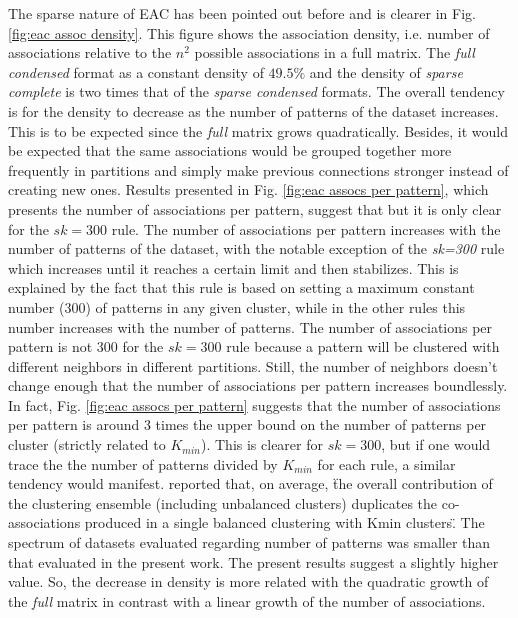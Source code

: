 The sparse nature of EAC has been pointed out before and is clearer in Fig. \ref{fig:eac assoc density}.
This figure shows the association density, i.e. number of associations relative to the $n^2$ possible associations in a full matrix.
The \emph{full condensed} format as a constant density of $49.5\%$ and the density of \emph{sparse complete} is two times that of the \emph{sparse condensed} formats.
The overall tendency is for the density to decrease as the number of patterns of the dataset increases.
This is to be expected since the \emph{full} matrix grows quadratically.
Besides, it would be expected that the same associations would be grouped together more frequently in partitions and simply make previous connections stronger instead of creating new ones.
Results presented in Fig. \ref{fig:eac assocs per pattern}, which presents the number of associations per pattern, suggest that but it is only clear for the $sk=300$ rule.
The number of associations per pattern increases with the number of patterns of the dataset, with the notable exception of the \emph{sk=300} rule which increases until it reaches a certain limit and then stabilizes.
This is explained by the fact that this rule is based on setting a maximum constant number ($300$) of patterns in any given cluster, while in the other rules this number increases with the number of patterns.
The number of associations per pattern is not $300$ for the $sk=300$ rule because a pattern will be clustered with different neighbors in different partitions.
Still, the number of neighbors doesn't change enough that the number of associations per pattern increases boundlessly.
In fact, Fig. \ref{fig:eac assocs per pattern} suggests that the number of associations per pattern is around 3 times the upper bound on the number of patterns per cluster (strictly related to $K_{min}$).
This is clearer for $sk=300$, but if one would trace the the number of patterns divided by $K_{min}$ for each rule, a similar tendency would manifest.
\citet{Lourenco2010} reported that, on average, \"the overall contribution of the clustering ensemble (including unbalanced clusters) duplicates the co-associations produced in a single balanced clustering with Kmin clusters\".
The spectrum of datasets evaluated regarding number of patterns was smaller than that evaluated in the present work.
The present results suggest a slightly higher value.
So, the decrease in density is more related with the quadratic growth of the \emph{full} matrix in contrast with a linear growth of the number of associations.

